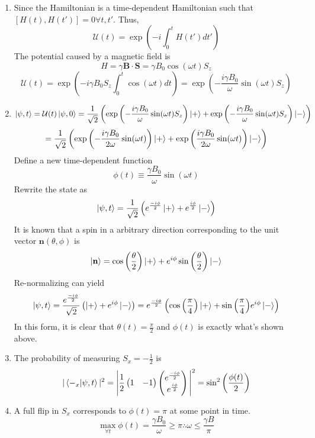 \begin{sol}
\begin{enumerate}[label=\textbf{(\alph*)}]
\item 
 Since the Hamiltonian is a time-dependent Hamiltonian such that $[H(t),H(t')]=0\forall t,t'$. Thus, 
 $$\mathcal U(t)=\exp\left(-i\int_0^t H(t')dt'\right)$$ 
 The potential caused by a magnetic field is 
 $$H=\gamma\mathbf B\cdot\mathbf S=\gamma B_0\cos(\omega t)S_z$$ 
 $$\mathcal U(t)=\exp\left(-i\gamma B_0S_z\int_0^t\cos(\omega t)dt\right)=\exp\left(-\frac{i\gamma B_0}{\omega}\sin(\omega t)S_z\right)$$ 
 \item
 $$\ket{\psi,t}=\mathcal U(t)\ket{\psi,0}=\frac{1}{\sqrt{2}}\left(\exp\left(-\frac{i\gamma B_0}{\omega}\sin(\omega t)S_z\right)\ket{+}+\exp\left(-\frac{i\gamma B_0}{\omega}\sin(\omega t)S_z\right)\ket-\right)$$ 
 $$=\frac{1}{\sqrt{2}}\left(\exp\left(-\frac{i\gamma B_0}{2\omega}\sin(\omega t)\right)\ket+ +\exp\left(\frac{i\gamma B_0}{2\omega}\sin(\omega t)\right)\ket-\right)$$ 
 Define a new time-dependent function $$\phi(t)\equiv\frac{\gamma B_0}{\omega}\sin(\omega t)$$ 
 Rewrite the state as
 $$\ket{\psi,t}=\frac{1}{\sqrt{2}}\left(e^{\frac{-i\phi}{2}}\ket++e^{\frac{i\phi}{2}}\ket-\right)$$ 
It is known that a spin in a arbitrary direction corresponding to the unit vector $\mathbf n(\theta, \phi)$ is
$$\ket{\mathbf{n}}=\cos\left(\frac{\theta}{2}\right)\ket{+}+e^{i\phi}\sin\left(\frac{\theta}{2}\right)\ket{-}$$
Re-normalizing can yield
 $$\ket{\psi,t}=\frac{e^{\frac{-i\phi}{2}}}{\sqrt{2}}\left(\ket++e^{i\phi}\ket-\right)=e^{\frac{-i\phi}{2}}\left(\cos\Big(\frac{\pi}{4}\Big)\ket++\sin\Big(\frac{\pi}{4}\Big)e^{i\phi}\ket-\right)$$ 
 In this form, it is clear that $\theta(t)=\frac{\pi}{2}$ and $\phi(t)$ is exactly what's shown above.
 \item
 The probability of measuring $S_x=-\frac{1}{2}$ is
 $$|\braket{-_x}{\psi,t}|^2=\Bigg|\frac{1}{2}\begin{pmatrix}
 1&-1
 \end{pmatrix}\begin{pmatrix}
 e^{\frac{-i\phi}{2}}\\e^{\frac{i\phi}{2}}
 \end{pmatrix}\Bigg|^2=\sin^2\left(\frac{\phi(t)}{2}\right)$$
 \item
 A full flip in $S_x$ corresponds to $\phi(t)=\pi$ at some point in time. 
 $$\max_{\forall t}\phi(t)=\frac{\gamma B_0}{\omega}\geq\pi\therefore\omega\leq\frac{\gamma B}{\pi}$$
 
\end{enumerate}
\end{sol}